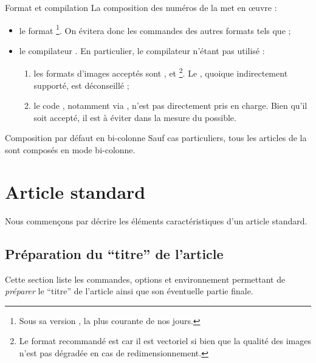 \begin{dbwarning}{Format et compilation }{}
  La composition des numéros de la \gzt*{} met en œuvre :
  \begin{itemize}
  \item le format \footnote{Sous sa version , la
      plus courante de nos jours.}. On évitera donc les commandes des autres
    formats tels que  ;
  \item le compilateur . En particulier, le compilateur
     n'étant pas utilisé :
    \begin{enumerate}
    \item les formats d'images acceptés sont ,  et
      \footnote{Le format recommandé est  car il est
        vectoriel si bien que la qualité des images n'est pas dégradée en cas de
        redimensionnement.}. Le , quoique indirectement
      supporté, est déconseillé ;
    \item le code , notamment via , n'est
      pas directement pris en charge. Bien qu'il soit accepté, il est à éviter
      dans la mesure du possible.
    \end{enumerate}
  \end{itemize}
\end{dbwarning}

\begin{dbremark}{Composition par défaut en bi-colonne}{}
  Sauf cas particuliers, tous les articles de la \gzt{} sont composés en mode
  bi-colonne.
\end{dbremark}

\section{Article standard}
\label{sec-article-standard}

Nous commençons par décrire les éléments caractéristiques d'un article standard.

\subsection{Préparation du \enquote{titre} de l'article}
\label{sec-prep-de-lart}

Cette section liste les commandes, options et environnement permettant de
\emph{préparer} le \enquote{titre} de l'article ainsi que son éventuelle partie
finale.

